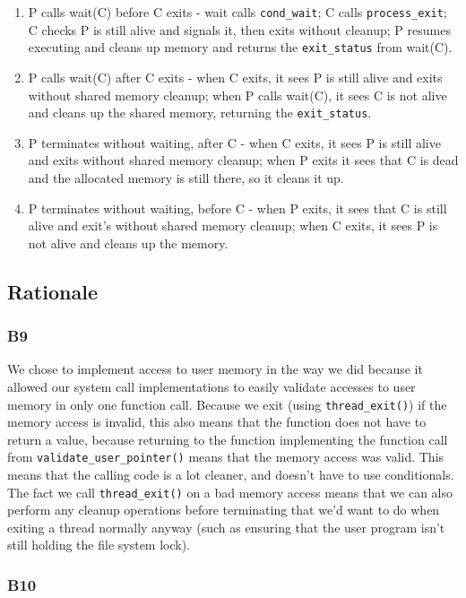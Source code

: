 \documentclass[a4wide, 11pt]{article}
\newcommand{\tx}{\texttt}
\begin{document}
\begin{enumerate}
\item P calls wait(C) before C exits - wait calls \texttt{cond\_wait}; C calls \texttt{process\_exit}; C checks P is still alive and signals it, then exits without cleanup; P resumes executing and cleans up memory and returns the \texttt{exit\_status} from wait(C).
\item P calls wait(C) after C exits - when C exits, it sees P is still alive and exits without shared memory cleanup; when P calls wait(C), it sees C is not alive and cleans up the shared memory, returning the \texttt{exit\_status}.
\item P terminates without waiting, after C - when C exits, it sees P is still alive and exits without shared memory cleanup; when P exits it sees that C is dead and the allocated memory is still there, so it cleans it up.
\item P terminates without waiting, before C - when P exits, it sees that C is still alive and exit's without shared memory cleanup; when C exits, it sees P is not alive and cleans up the memory.
\end{enumerate}


\subsection{Rationale}
\subsubsection{B9}

We chose to implement access to user memory in the way we did because it allowed our system call implementations to easily validate accesses to user memory in only one function call. Because we exit (using \tx{thread\_exit()}) if the memory access is invalid, this also means that the function does not have to return a value, because returning to the function implementing the function call from \tx{validate\_user\_pointer()} means that the memory access was valid. This means that the calling code is a lot cleaner, and doesn't have to use conditionals. The fact we call \tx{thread\_exit()} on a bad memory access means that we can also perform any cleanup operations before terminating that we'd want to do when exiting a thread normally anyway (such as ensuring that the user program isn't still holding the file system lock).

\subsubsection{B10}
\end{document}
